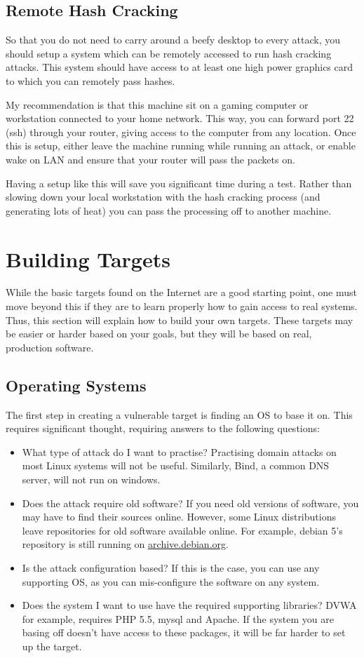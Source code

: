 		\subsection{Remote Hash Cracking}
			So that you do not need to carry around a beefy desktop to every attack, you should setup a system which can be remotely accessed to run hash cracking attacks.
			This system should have access to at least one high power graphics card to which you can remotely pass hashes.

			My recommendation is that this machine sit on a gaming computer or workstation connected to your home network.
			This way, you can forward port 22 (ssh) through your router, giving access to the computer from any location.
			Once this is setup, either leave the machine running while running an attack, or enable wake on LAN and ensure that your router will pass the packets on.

			Having a setup like this will save you significant time during a test.
			Rather than slowing down your local workstation with the hash cracking process (and generating lots of heat) you can pass the processing off to another machine.


	\section{Building Targets}
		While the basic targets found on the Internet are a good starting point, one must move beyond this if they are to learn properly how to gain access to real systems.
		Thus, this section will explain how to build your own targets.
		These targets may be easier or harder based on your goals, but they will be based on real, production software.

		\subsection{Operating Systems}
			The first step in creating a vulnerable target is finding an OS to base it on.
			This requires significant thought, requiring answers to the following questions:
			\begin{itemize}
				\item What type of attack do I want to practise?
					Practising domain attacks on most Linux systems will not be useful.
					Similarly, Bind, a common DNS server, will not run on windows.
				\item Does the attack require old software?
					If you need old versions of software, you may have to find their sources online.
					However, some Linux distributions leave repositories for old software available online.
					For example, debian 5's repository is still running on \url{archive.debian.org}.
				\item Is the attack configuration based?
					If this is the case, you can use any supporting OS, as you can mis-configure the software on any system.
				\item Does the system I want to use have the required supporting libraries?
					DVWA for example, requires PHP 5.5, mysql and Apache.
					If the system you are basing off doesn't have access to these packages, it will be far harder to set up the target.
			\end{itemize}
